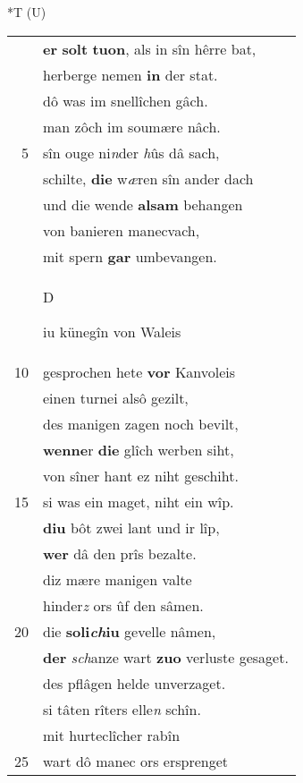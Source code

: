 \documentclass[8pt,a4paper,notitlepage]{article}
\begin{document}
\begin{table}[ht]
\begin{minipage}[t]{0.5\linewidth}
\end{minipage}
\hspace{0.5cm}
\begin{minipage}[t]{0.5\linewidth}
\small
\begin{center}*T (U)
\end{center}
\begin{tabular}{rl}
 & \textbf{er} \textbf{solt} \textbf{tuon}, als in sîn hêrre bat,\\ 
 & herberge nemen \textbf{in} der stat.\\ 
 & dô was im snellîchen gâch.\\ 
 & man zôch im soumære nâch.\\ 
5 & sîn ouge ni\textit{n}der \textit{h}ûs dâ sach,\\ 
 & schilte, \textbf{die} w\textit{æ}ren sîn ander dach\\ 
 & und die wende \textbf{alsam} behangen\\ 
 & von banieren manecvach,\\ 
 & mit spern \textbf{gar} umbevangen.\\ 
 & \begin{large}D\end{large}iu künegîn von Waleis\\ 
10 & gesprochen hete \textbf{vor} Kanvoleis\\ 
 & einen turnei alsô gezilt,\\ 
 & des manigen zagen noch bevilt,\\ 
 & \textbf{wenne}r \textbf{die} glîch werben siht,\\ 
 & von sîner hant ez niht geschiht.\\ 
15 & si was ein maget, niht ein wîp.\\ 
 & \textbf{diu} bôt zwei lant und ir lîp,\\ 
 & \textbf{wer} dâ den prîs bezalte.\\ 
 & diz mære manigen valte\\ 
 & hinder\textit{z} ors ûf den sâmen.\\ 
20 & die \textbf{soli\textit{ch}iu} gevelle nâmen,\\ 
 & \textbf{der} \textit{sch}anze wart \textbf{zuo} verluste gesaget.\\ 
 & des pflâgen helde unverzaget.\\ 
 & si tâten rîters elle\textit{n} schîn.\\ 
 & mit hurteclîcher rabîn\\ 
25 & wart dô manec ors ersprenget\\ 

\end{tabular}
\end{minipage}
\end{table}
\end{document}
